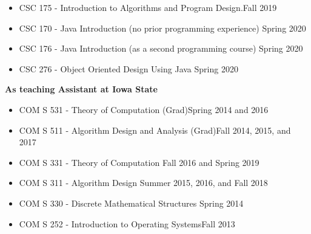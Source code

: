 \documentclass[10pt]{article}
\begin{document}
\begin{itemize}
\item[] CSC 175 - Introduction to Algorithms and Program Design.\hfill {Fall 2019}
\item[] CSC 170 - Java Introduction (no prior programming experience) \hfill {Spring 2020}
\item[] CSC 176 - Java Introduction (as a second programming course)  \hfill {Spring 2020}
\item[] CSC 276 - Object Oriented Design Using Java \hfill{Spring 2020}
\end{itemize}
\textbf{As teaching Assistant at Iowa State}
\begin{itemize}
\item[] COM S 531 - Theory of Computation (Grad)\hfill {Spring 2014 and 2016}
\item[] COM S 511 - Algorithm Design and Analysis (Grad)\hfill {Fall 2014, 2015, and 2017}
\item[] COM S 331 - Theory of Computation \hfill {Fall 2016 and Spring 2019}
\item[] COM S 311 - Algorithm Design \hfill {Summer 2015, 2016, and Fall 2018 }
\item[] COM S 330 - Discrete Mathematical Structures \hfill {Spring 2014}
\item[] COM S 252 - Introduction to Operating Systems\hfill {Fall 2013}
\end{itemize}
\end{document}
